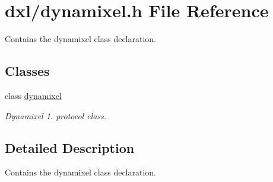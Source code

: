 \hypertarget{a00014}{}\section{dxl/dynamixel.h File Reference}
\label{a00014}


Contains the dynamixel class declaration.  


\subsection*{Classes}
\begin{DoxyCompactItemize}
\item 
class \hyperlink{a00004}{dynamixel}
\begin{DoxyCompactList}\small\item\em Dynamixel 1. protocol class. \end{DoxyCompactList}\end{DoxyCompactItemize}


\subsection{Detailed Description}
Contains the dynamixel class declaration. 

